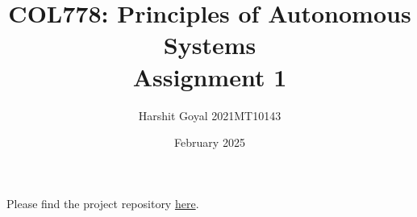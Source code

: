\documentclass{article}
\title{COL778: Principles of Autonomous Systems\\Assignment 1}
\author{Harshit Goyal 2021MT10143}
\date{February 2025}
\begin{document}
\maketitle
Please find the project repository \href{https://github.com/Harshit0143/COL778-Principles-of-Autonomous-System/tree/main/Assignment1}{here}.\\
\tableofcontents



\end{document}
